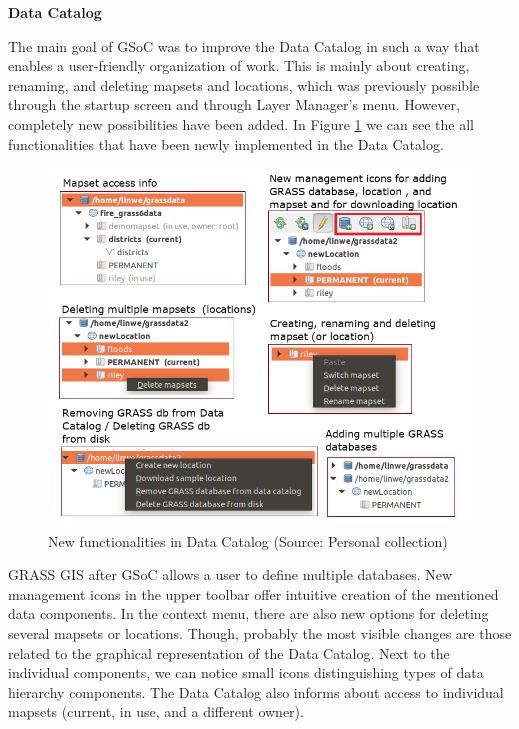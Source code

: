 \documentclass[a4paper,10pt,twoside]{article}
\begin{document}
\bigskip
\noindent \textbf {Data Catalog}

\noindent The main goal of GSoC was to improve the Data Catalog in
such a way that enables a user-friendly organization of work. This is
mainly about creating, renaming, and deleting mapsets and locations,
which was previously possible through the startup screen and through 
Layer Manager's menu. However, completely new possibilities have 
been added. In Figure \ref{fig:function} we can see the all
functionalities that have been newly implemented in the Data Catalog.

\vspace{0.3cm}
\begin{figure}[hbt!] 
\begin{center}
\includegraphics[width=13cm]{../pictures/funkce.png} 
\caption[New functionalities in Data Catalog]{New functionalities in Data Catalog (Source: Personal collection)}
\label{fig:function}
\end{center}
\end{figure}

\noindent GRASS GIS after GSoC allows a user
to define multiple databases. New management icons in the upper toolbar offer intuitive
creation of the mentioned data components. In the context menu, there
are also new options for deleting several mapsets or
locations. Though, probably the most visible changes are those related
to the graphical representation of the Data Catalog. Next to the
individual components, we can notice small icons distinguishing types
of data hierarchy components. The Data Catalog also informs about
access to individual mapsets (current, in use, and a different
owner). 
\end{document}
